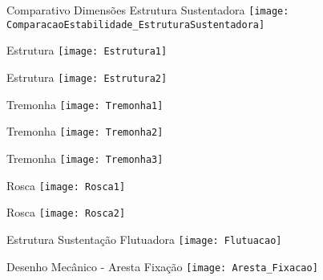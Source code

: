 \begin{figure}
\centering
Comparativo Dimensões Estrutura Sustentadora
\texttt{[image: ComparacaoEstabilidade\_EstruturaSustentadora]}
\linebreak
\end{figure}

\begin{figure}
\centering
Estrutura
\texttt{[image: Estrutura1]}
\linebreak
\end{figure}

\begin{figure}
\centering
Estrutura
\texttt{[image: Estrutura2]}
\linebreak
\end{figure}

\begin{figure}
\centering
Tremonha
\texttt{[image: Tremonha1]}
\linebreak
\end{figure}

\begin{figure}
\centering
Tremonha
\texttt{[image: Tremonha2]}
\linebreak
\end{figure}

\begin{figure}
\centering
Tremonha
\texttt{[image: Tremonha3]}
\linebreak
\end{figure}

\begin{figure}
\centering
Rosca
\texttt{[image: Rosca1]}
\linebreak
\end{figure}

\begin{figure}
\centering
Rosca
\texttt{[image: Rosca2]}
\linebreak
\end{figure}



\begin{figure}
\centering
Estrutura Sustentação Flutuadora
\texttt{[image: Flutuacao]}
\linebreak
\end{figure}

\begin{figure}
\centering
Desenho Mecânico - Aresta Fixação
\texttt{[image: Aresta\_Fixacao]}
\linebreak
\end{figure}

